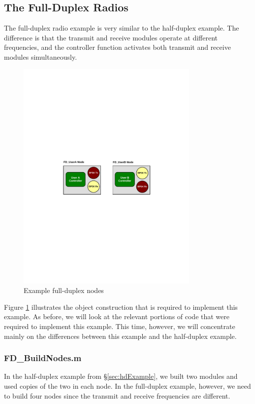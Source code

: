 \subsection{The Full-Duplex Radios}

The full-duplex radio example is very similar to the half-duplex
example.  The difference is that the transmit and receive modules
operate at different frequencies, and the controller function
activates both transmit and receive modules simultaneously.

\begin{figure}[h]
\centering
\includegraphics[width=3.5in]{figs/FD_Example}
\caption{Example full-duplex nodes} \label{fig:fdNodes}
\end{figure}

Figure \ref{fig:fdNodes} illustrates the object construction that is
required to implement this example.  As before, we will look at the
relevant portions of code that were required to implement this
example.  This time, however, we will concentrate mainly on the
differences between this example and the half-duplex example.

\subsubsection{FD\_BuildNodes.m}

In the half-duplex example from \S\ref{sec:hdExample}, we built two
modules and used copies of the two in each node. In the full-duplex
example, however, we need to build four nodes since the transmit and
receive frequencies are different.


